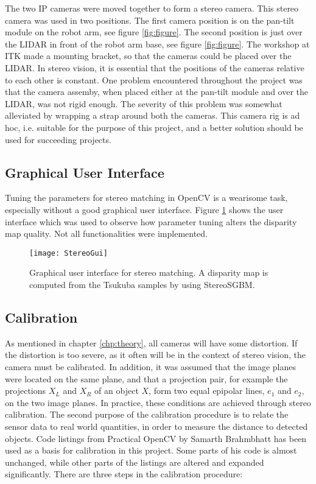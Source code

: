The two IP cameras were moved together to form a stereo camera. This stereo camera was used in two positions. The first camera position is on the pan-tilt module on the robot arm, see figure \ref{fig:figure}. The second position is just over the LIDAR in front of the robot arm base, see figure \ref{fig:figure}.  The workshop at ITK made a mounting bracket, so that the cameras could be placed over the LIDAR. In stereo vision, it is essential that the positions of the cameras relative to each other is constant. One problem encountered throughout the project was that the camera assemby, when placed either at the pan-tilt module and over the LIDAR, was not rigid enough. The severity of this problem was somewhat alleviated by wrapping a strap around both the cameras. This camera rig is ad hoc, i.e. suitable for the purpose of this project, and a better solution should be used for succeeding projects.

\subsection{Graphical User Interface}

Tuning the parameters for stereo matching in OpenCV is a wearisome task, especially without a good graphical user interface. Figure \ref{fig:StereoGui} shows the user interface which was used to observe how parameter tuning alters the disparity map quality. Not all functionalities were implemented.

\begin{figure}
	\texttt{[image: StereoGui]}
	\caption{Graphical user interface for stereo matching. A disparity map is computed from the Tsukuba samples by using StereoSGBM. }
	\label{fig:StereoGui}
\end{figure}

\subsection{Calibration}

As mentioned in chapter \ref{chp:theory}, all cameras will have some distortion. If the distortion is too severe, as it often will be in the context of stereo vision, the camera must be calibrated. In addition, it was assumed that the image planes were located on the same plane, and that a projection pair, for example the projections $X_L$ and $X_R$ of an object $X$, form two equal epipolar lines, $e_1$ and $e_2$, on the two image planes. In practice, these conditions are achieved through stereo calibration. The second purpose of the calibration procedure is to relate the sensor data to real world quantities, in order to measure the distance to detected objects. Code listings from Practical OpenCV by Samarth Brahmbhatt \cite{practicalopencv} has been used as a basis for calibration in this project. Some parts of his code is almost unchanged, while other parts of the listings are altered and expanded significantly. There are three steps in the calibration procedure:

